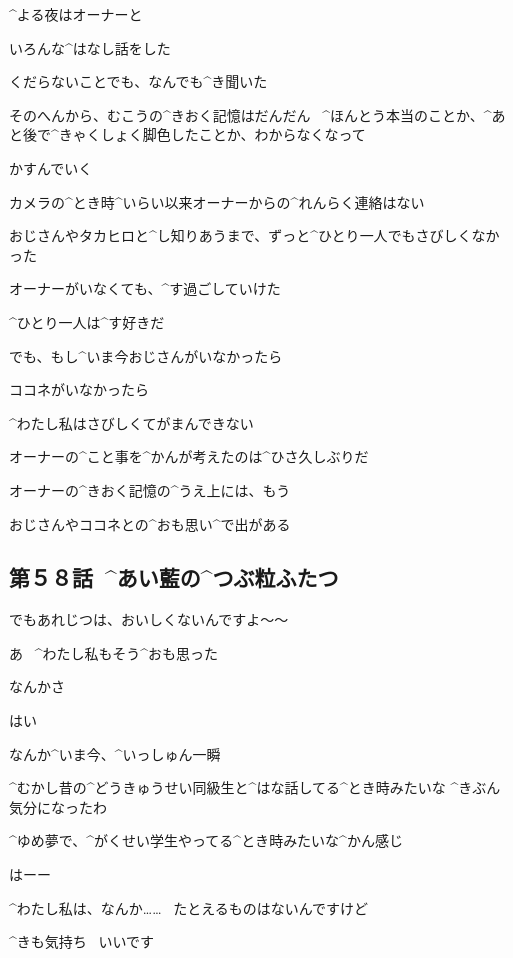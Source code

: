 \page
\Alpha ^{よる}{夜}はオーナーと

\Alpha いろんな^{はなし}{話}をした

\Alpha くだらないことでも、なんでも^{き}{聞}いた

\Alpha そのへんから、むこうの^{きおく}{記憶}はだんだん
\ ^{ほんとう}{本当}のことか、^{あと}{後}で^{きゃくしょく}{脚色}したことか、わからなくなって

\Alpha かすんでいく

\page[38]
\Alpha カメラの^{とき}{時}^{いらい}{以来}オーナーからの^{れんらく}{連絡}はない

\page
\Alpha おじさんやタカヒロと^{し}{知}りあうまで、ずっと^{ひとり}{一人}でもさびしくなかった

\Alpha オーナーがいなくても、^{す}{過}ごしていけた

\Alpha ^{ひとり}{一人}は^{す}{好}きだ

\Alpha でも、もし^{いま}{今}おじさんがいなかったら

\Alpha ココネがいなかったら

\Alpha ^{わたし}{私}はさびしくてがまんできない

\page
\Alpha オーナーの^{こと}{事}を^{かんが}{考}えたのは^{ひさ}{久}しぶりだ

\Alpha オーナーの^{きおく}{記憶}の^{うえ}{上}には、もう

\Alpha おじさんやココネとの^{おも}{思}い^{で}{出}がある


\subsection{第５８話\ ^{あい}{藍}の^{つぶ}{粒}ふたつ}

\page[43]
\Alpha でもあれじつは、おいしくないんですよ〜〜

\Sensei あ
\ ^{わたし}{私}もそう^{おも}{思}った

\page
\Sensei なんかさ

\Alpha はい

\Sensei なんか^{いま}{今}、^{いっしゅん}{一瞬}

\Sensei ^{むかし}{昔}の^{どうきゅうせい}{同級生}と^{はな}{話}してる^{とき}{時}みたいな
^{きぶん}{気分}になったわ

\Sensei ^{ゆめ}{夢}で、^{がくせい}{学生}やってる^{とき}{時}みたいな^{かん}{感}じ

\Alpha はーー

\page
\Alpha ^{わたし}{私}は、なんか……
\ たとえるものはないんですけど

\Alpha ^{きも}{気持}ち
\ いいです

